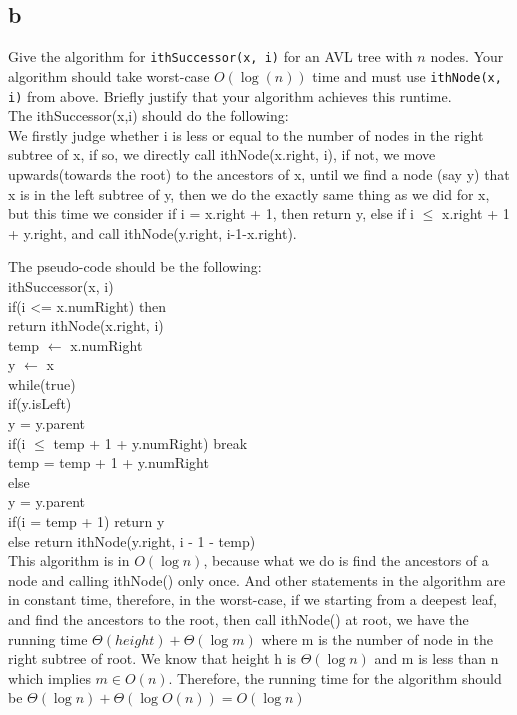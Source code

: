 \documentclass[12pt]{article}
\begin{document}
\begin{enumerate}
		\part{b} Give the algorithm for {\tt ithSuccessor(x, i)} for an AVL tree with $n$ nodes.  
		Your algorithm should take worst-case $O(\log(n))$ time and must use {\tt ithNode(x, i)} from above.
		Briefly justify that your algorithm achieves this runtime.\\
		
		The ithSuccessor(x,i) should do the following:\\
		We firstly judge whether i is less or equal to the number of nodes in the right subtree of x, if so, we directly call ithNode(x.right, i), if not, we move upwards(towards the root) to the ancestors of x, until we find a node (say y) that x is in the left subtree of y, then we do the exactly same thing as we did for x, but this time we consider if i = x.right + 1, then return y, else if i $\leq$ x.right + 1 + y.right, and call ithNode(y.right, i-1-x.right).
		
		The pseudo-code should be the following:\\
		ithSuccessor(x, i)\\
		\hphantom{1111} if(i <= x.numRight) then\\
		\hphantom{11111111} return ithNode(x.right, i)\\
		\hphantom{1111} temp $\gets$ x.numRight\\
		\hphantom{1111} y $\gets$ x\\
		\hphantom{1111} while(true)\\
		\hphantom{11111111} if(y.isLeft)\\
		\hphantom{111111111111} y = y.parent\\
		\hphantom{111111111111} if(i $\leq$ temp + 1 + y.numRight) break\\
		\hphantom{111111111111} temp = temp + 1 + y.numRight\\
		\hphantom{11111111} else\\
		\hphantom{111111111111} y = y.parent\\
		\hphantom{1111} if(i = temp + 1) return y\\
		\hphantom{1111} else return ithNode(y.right, i - 1 - temp)\\
		
		This algorithm is in $O(\log n)$, because what we do is find the ancestors of a node and calling ithNode() only once. And other statements in the algorithm are in constant time, therefore, in the worst-case, if we starting from a deepest leaf, and find the ancestors to the root, then call ithNode() at root, we have the running time $\Theta(height) + \Theta (\log m)$ where m is the number of node in the right subtree of root. We know that height h is $\Theta(\log n)$ and m is less than n which implies $m \in O(n)$. Therefore, the running time for the algorithm should be $\Theta(\log n) + \Theta(\log O(n)) = O(\log n)$
		
	\end{enumerate}
	
	
	
	
	
\end{document}
